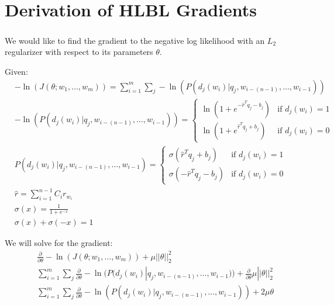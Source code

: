 
\chapter{Derivation of HLBL Gradients}
\paragraph{}
We would like to find the gradient to the negative log likelihood with an $L_2$ regularizer with respect to its parameters $\theta$.

Given:
\begin{align*}
&-\ln(J(\theta;w_1,\dots, w_m)) = \sum_{i=1}^{m} \sum_j -\ln(P(d_j(w_i) | q_j, w_{i-(n-1)},\dots, w_{i-1}))
\\ 
&-\ln(P(d_j(w_i) | q_j, w_{i-(n-1)},\dots, w_{i-1})) =  
\begin{cases}
  \ln (1 + e^{-\hat{r}^T q_{j} -b_{j}}) & \text{if } d_j(w_i)  = 1 \\
  \ln (1 + e^{\hat{r}^T q_{j} +b_{j}})     & \text{if } d_j(w_i) = 0
  \end{cases}
\\
&P(d_j(w_i) | q_j, w_{i-(n-1)},\dots, w_{i-1}) =  
\begin{cases}
  \sigma(\hat{r}^T q_{j} +b_{j}) & \text{if } d_j(w_i)  = 1 \\
  \sigma(-\hat{r}^T q_{j} -b_{j})     & \text{if } d_j(w_i) = 0
  \end{cases}
\\
&\hat{r} = \sum_{i=1}^{n-1} C_i r_{w_i} 
\\
&\sigma(x) = \frac{1}{1+e^{-x}}
\\
&\sigma(x) +\sigma(-x) = 1
\end{align*}

We will solve for the gradient:
\begin{align*}
&\frac{\partial}{\partial \theta} -\ln(J(\theta;w_1,\dots, w_m)) +  \mu ||\theta||^2_2
\\
& \sum_{i=1}^{m} \sum_j \frac{\partial}{\partial \theta} -\ln(P(d_j(w_i) | q_j, w_{i-(n-1)},\dots, w_{i-1})) +\frac{\partial}{\partial \theta}  \mu ||\theta||^2_2
\\
& \sum_{i=1}^{m} \sum_j \frac{\partial}{\partial \theta} -\ln(P(d_j(w_i) | q_j, w_{i-(n-1)},\dots, w_{i-1})) + 2 \mu \theta
\end{align*}

